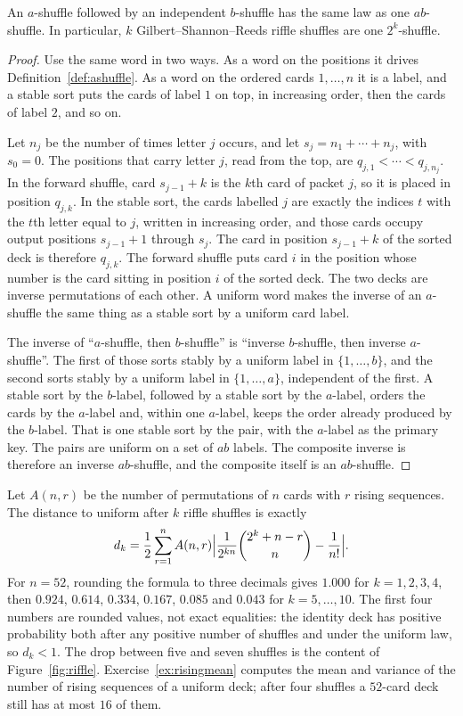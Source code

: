 \begin{proposition}[composition]\label{prop:rifflecompose}
An $a$-shuffle followed by an independent $b$-shuffle has the same law as one $ab$-shuffle. In particular, $k$ Gilbert--Shannon--Reeds riffle shuffles are one $2^k$-shuffle.
\end{proposition}
\begin{proof}
Use the same word in two ways. As a word on the positions it drives Definition~\ref{def:ashuffle}. As a word on the ordered cards $1,\ldots,n$ it is a label, and a stable sort puts the cards of label $1$ on top, in increasing order, then the cards of label $2$, and so on.

Let $n_j$ be the number of times letter $j$ occurs, and let $s_j=n_1+\cdots+n_j$, with $s_0=0$. The positions that carry letter $j$, read from the top, are $q_{j,1}<\cdots<q_{j,n_j}$. In the forward shuffle, card $s_{j-1}+k$ is the $k$th card of packet $j$, so it is placed in position $q_{j,k}$. In the stable sort, the cards labelled $j$ are exactly the indices $t$ with the $t$th letter equal to $j$, written in increasing order, and those cards occupy output positions $s_{j-1}+1$ through $s_j$. The card in position $s_{j-1}+k$ of the sorted deck is therefore $q_{j,k}$. The forward shuffle puts card $i$ in the position whose number is the card sitting in position $i$ of the sorted deck. The two decks are inverse permutations of each other. A uniform word makes the inverse of an $a$-shuffle the same thing as a stable sort by a uniform card label.

The inverse of ``$a$-shuffle, then $b$-shuffle'' is ``inverse $b$-shuffle, then inverse $a$-shuffle''. The first of those sorts stably by a uniform label in $\{1,\ldots,b\}$, and the second sorts stably by a uniform label in $\{1,\ldots,a\}$, independent of the first. A stable sort by the $b$-label, followed by a stable sort by the $a$-label, orders the cards by the $a$-label and, within one $a$-label, keeps the order already produced by the $b$-label. That is one stable sort by the pair, with the $a$-label as the primary key. The pairs are uniform on a set of $ab$ labels. The composite inverse is therefore an inverse $ab$-shuffle, and the composite itself is an $ab$-shuffle.
\end{proof}

Let $A(n,r)$ be the number of permutations of $n$ cards with $r$ rising sequences. The distance to uniform after $k$ riffle shuffles is exactly
\[
 d_k=\frac12\sum_{r=1}^n A(n,r)\Bigl|\frac1{2^{kn}}\binom{2^k+n-r}{n}-\frac1{n!}\Bigr|.
\]
For $n=52$, rounding the formula to three decimals gives $1.000$ for $k=1,2,3,4$, then $0.924$, $0.614$, $0.334$, $0.167$, $0.085$ and $0.043$ for $k=5,\ldots,10$. The first four numbers are rounded values, not exact equalities: the identity deck has positive probability both after any positive number of shuffles and under the uniform law, so $d_k<1$. The drop between five and seven shuffles is the content of Figure~\ref{fig:riffle}. Exercise~\ref{ex:risingmean} computes the mean and variance of the number of rising sequences of a uniform deck; after four shuffles a $52$-card deck still has at most $16$ of them.


